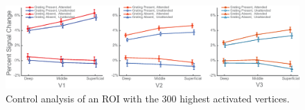 \begin{figure}[!ht]
\centering
\includegraphics[width=1.0\textwidth, clip=true]{./Chapters/04_Attention/Images/SM_LayerResults_300vertices}
\caption{Control analysis of an ROI with the 300 highest activated vertices.}
\label{fig:layerresults300}
\end{figure}